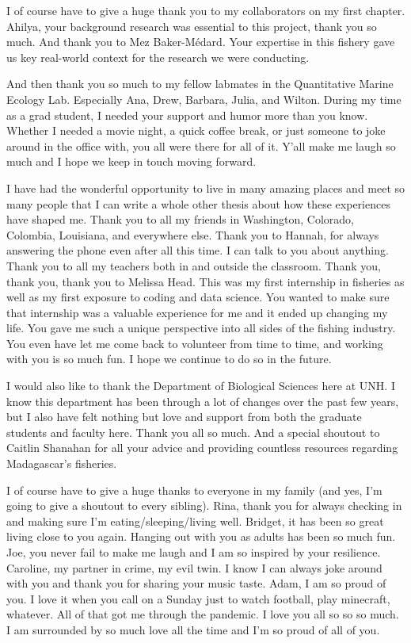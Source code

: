 \documentclass[
]{article}
\begin{document}
I of course have to give a huge thank you to my collaborators on my first chapter. Ahilya, your background research was essential to this project, thank you so much. And thank you to Mez Baker-Médard. Your expertise in this fishery gave us key real-world context for the research we were conducting.

And then thank you so much to my fellow labmates in the Quantitative Marine Ecology Lab. Especially Ana, Drew, Barbara, Julia, and Wilton. During my time as a grad student, I needed your support and humor more than you know. Whether I needed a movie night, a quick coffee break, or just someone to joke around in the office with, you all were there for all of it. Y'all make me laugh so much and I hope we keep in touch moving forward.

I have had the wonderful opportunity to live in many amazing places and meet so many people that I can write a whole other thesis about how these experiences have shaped me. Thank you to all my friends in Washington, Colorado, Colombia, Louisiana, and everywhere else. Thank you to Hannah, for always answering the phone even after all this time. I can talk to you about anything. Thank you to all my teachers both in and outside the classroom. Thank you, thank you, thank you to Melissa Head. This was my first internship in fisheries as well as my first exposure to coding and data science. You wanted to make sure that internship was a valuable experience for me and it ended up changing my life. You gave me such a unique perspective into all sides of the fishing industry. You even have let me come back to volunteer from time to time, and working with you is so much fun. I hope we continue to do so in the future.

I would also like to thank the Department of Biological Sciences here at UNH. I know this department has been through a lot of changes over the past few years, but I also have felt nothing but love and support from both the graduate students and faculty here. Thank you all so much. And a special shoutout to Caitlin Shanahan for all your advice and providing countless resources regarding Madagascar's fisheries.

I of course have to give a huge thanks to everyone in my family (and yes, I'm going to give a shoutout to every sibling). Rina, thank you for always checking in and making sure I'm eating/sleeping/living well. Bridget, it has been so great living close to you again. Hanging out with you as adults has been so much fun. Joe, you never fail to make me laugh and I am so inspired by your resilience. Caroline, my partner in crime, my evil twin. I know I can always joke around with you and thank you for sharing your music taste. Adam, I am so proud of you. I love it when you call on a Sunday just to watch football, play minecraft, whatever. All of that got me through the pandemic. I love you all so so so much. I am surrounded by so much love all the time and I'm so proud of all of you.
\end{document}
